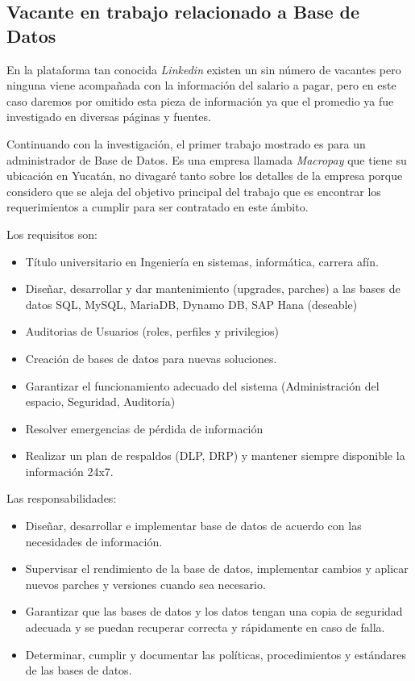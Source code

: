 \documentclass{article}
\begin{document}
\subsection{Vacante en trabajo relacionado a Base de Datos}


En la plataforma tan conocida \emph{Linkedin} existen un sin número de vacantes pero ninguna viene acompañada con la
información del salario a pagar, pero en este caso daremos por omitido esta pieza de información ya que el promedio ya fue
investigado en diversas páginas y fuentes.


Continuando con la investigación, el primer trabajo mostrado es para un administrador de Base de Datos. Es una empresa llamada
\emph{Macropay} que tiene su ubicación en Yucatán, no divagaré tanto sobre los detalles de la empresa porque considero que se aleja
del objetivo principal del trabajo que es encontrar los requerimientos a cumplir para ser contratado en este ámbito.


Los requisitos son:
\begin{itemize}
   \item Título universitario en Ingeniería en sistemas, informática, carrera afín.
   \item Diseñar, desarrollar y dar mantenimiento (upgrades, parches) a las bases de datos SQL, MySQL, MariaDB, Dynamo DB, SAP Hana (deseable)
   \item Auditorias de Usuarios (roles, perfiles y privilegios)
   \item Creación de bases de datos para nuevas soluciones.
   \item Garantizar el funcionamiento adecuado del sistema (Administración del espacio, Seguridad, Auditoría)
   \item Resolver emergencias de pérdida de información
   \item Realizar un plan de respaldos (DLP, DRP) y mantener siempre disponible la información 24x7.
\end{itemize}


Las responsabilidades:
\begin{itemize}
   \item Diseñar, desarrollar e implementar base de datos de acuerdo con las necesidades de información.
   \item Supervisar el rendimiento de la base de datos, implementar cambios y aplicar nuevos parches y versiones cuando sea necesario.
   \item Garantizar que las bases de datos y los datos tengan una copia de seguridad adecuada y se puedan recuperar correcta y rápidamente en caso de falla.
   \item Determinar, cumplir y documentar las políticas, procedimientos y estándares de las bases de datos.
\end{itemize}
\end{document}
